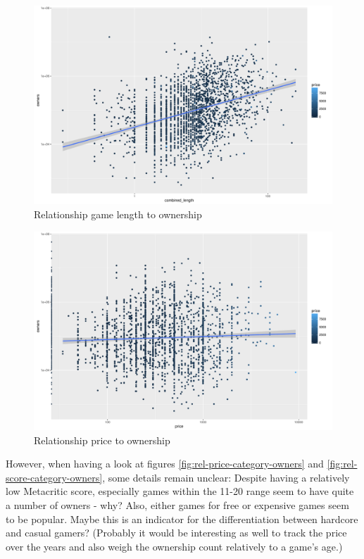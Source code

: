 \begin{figure}[!t]
	\centering
	\includegraphics[width=1.0\columnwidth]{images/rel-combinedlength-owners.pdf}
	\caption{Relationship game length to ownership}
\label{fig:rel-combinedlength-owners}
\end{figure}

\begin{figure}[!t]
	\centering
	\includegraphics[width=1.0\columnwidth]{images/rel-price-owners.pdf}
	\caption{Relationship price to ownership}
\label{fig:rel-price-owners}
\end{figure}

However, when having a look at figures \ref{fig:rel-price-category-owners} and \ref{fig:rel-score-category-owners}, some details remain unclear: Despite having a relatively low Metacritic score, especially games within the 11-20 range seem to have quite a number of owners - why? Also, either games for free or expensive games seem to be popular. Maybe this is an indicator for the differentiation between hardcore and casual gamers? (Probably it would be interesting as well to track the price over the years and also weigh the ownership count relatively to a game's age.)

